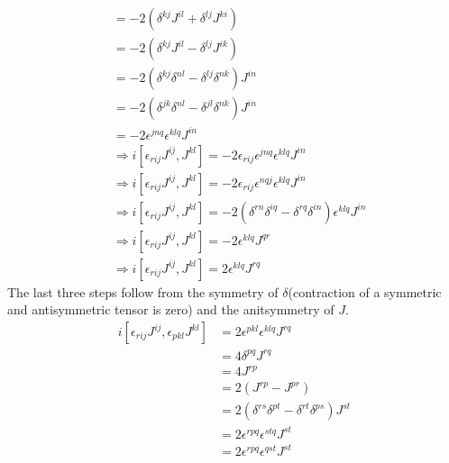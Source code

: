 \documentclass[12pt,a4]{article}
\begin{document}
\begin{enumerate}
\begin{enumerate}
\begin{align*}
                        &= -2(\delta^{kj} J^{il} + \delta^{lj} J^{ki})\\
                        &= -2(\delta^{kj} J^{il} - \delta^{lj} J^{ik})\\
                        &= -2(\delta^{kj}\delta^{nl}  - \delta^{lj}\delta^{nk} )J^{in}\\
                        &= -2(\delta^{jk}\delta^{nl}  - \delta^{jl}\delta^{nk} )J^{in}\\
                        &= -2\epsilon^{jnq}\epsilon^{klq}J^{in}\\
                        &\Rightarrow i [\epsilon_{rij} J^{ij},J^{kl}] = -2\epsilon_{rij}\epsilon^{jnq}\epsilon^{klq}J^{in}\\
                        &\Rightarrow i [\epsilon_{rij} J^{ij},J^{kl}] = -2\epsilon_{rij}\epsilon^{nqj}\epsilon^{klq}J^{in}\\
                        &\Rightarrow i [\epsilon_{rij} J^{ij},J^{kl}] = -2(\delta^{rn}\delta^{iq}  - \delta^{rq}\delta^{in} )\epsilon^{klq}J^{in}\\
                        &\Rightarrow i [\epsilon_{rij} J^{ij},J^{kl}] = -2\epsilon^{klq}J^{qr}\\
                        &\Rightarrow i [\epsilon_{rij} J^{ij},J^{kl}] = 2\epsilon^{klq}J^{rq}
    \end{align*}
    The last three steps follow from the symmetry of $\delta$(contraction of a symmetric and antisymmetric tensor is zero) and the anitsymmetry of $J$.
    \begin{align*}
                      i [\epsilon_{rij} J^{ij},\epsilon_{pkl} J^{kl}] &= 2\epsilon^{pkl}\epsilon^{klq}J^{rq}\\
                                                                      &= 4\delta^{pq} J^{rq}\\
                                                                      &= 4 J^{rp}\\
                                                                      &= 2 (J^{rp} - J^{pr})\\
                                                                      &= 2 (\delta^{rs}\delta^{pt} - \delta^{rt}\delta^{ps})J^{st}\\
                                                                      &= 2 \epsilon^{rpq}\epsilon^{stq}J^{st}\\
                                                                      &= 2 \epsilon^{rpq}\epsilon^{qst}J^{st}

\end{align*}
\end{enumerate}
\end{enumerate}
\end{document}
